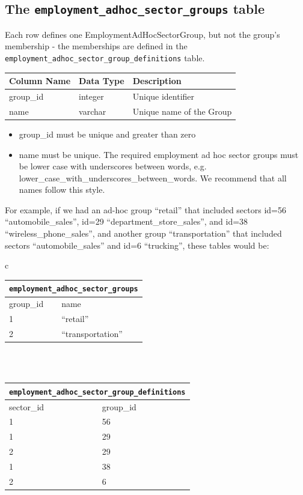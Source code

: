 \subsection{The {\tt employment_adhoc_sector_groups} table}

Each row defines one EmploymentAdHocSectorGroup, but not the group's membership
- the memberships are defined in the \verb|employment_adhoc_sector_group_definitions| table.

\begin{tabular}{lll}
\textbf{Column Name} & \textbf{Data Type} & \textbf{Description} \\
\hline
group_id & integer & Unique identifier  \\
\hline
name & varchar & Unique name of the Group  \\
\hline

\end{tabular}

\begin{itemize}
\tight
\item group_id must be unique and greater than zero
\item name must be unique. The required employment ad hoc sector groups must be
lower case with underscores between words, e.g.
lower_case_with_underscores_between_words. We recommend that all names follow
this style.
\end{itemize}

For example, if we had an ad-hoc group ``retail'' that included sectors id=56
``automobile_sales'', id=29 ``department_store_sales'', and id=38
``wireless_phone_sales'', and another group ``transportation'' that included
sectors ``automobile_sales'' and id=6 ``trucking'', these tables would be:

\begin{center}
\begin{tabular}{c}

\begin{tabular}{ll}
\multicolumn{2}{c}{\tt employment_adhoc_sector_groups}\\
\hline
group_id & name \\
\hline
1 &``retail'' \\
\hline
2 &``transportation'' \\
\hline
\end{tabular}

\\ \\

\begin{tabular}{ll}
\multicolumn{2}{c}{\tt employment_adhoc_sector_group_definitions}\\
\hline
sector_id & group_id \\
\hline
1 &56 \\
\hline
1 &29 \\
\hline
2 &29 \\
\hline
1 &38 \\
\hline
2 &6 \\
\hline
\end{tabular}

\end{tabular}
\end{center}

